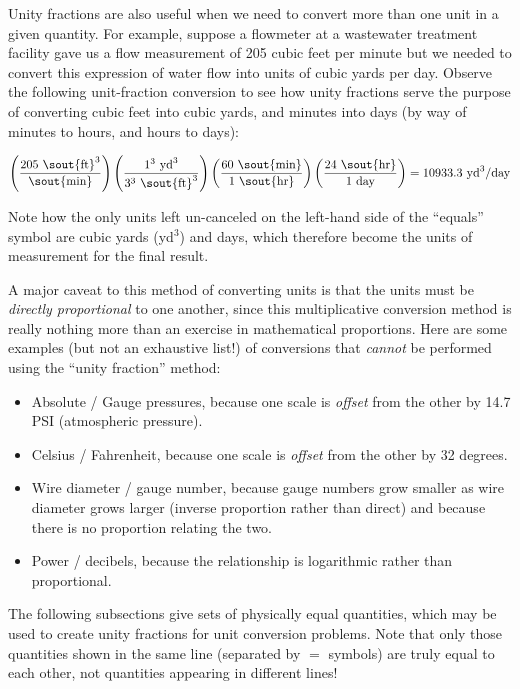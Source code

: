 \vskip 10pt

Unity fractions are also useful when we need to convert more than one unit in a given quantity.  For example, suppose a flowmeter at a wastewater treatment facility gave us a flow measurement of 205 cubic feet per minute but we needed to convert this expression of water flow into units of cubic yards per day.  Observe the following unit-fraction conversion to see how unity fractions serve the purpose of converting cubic feet into cubic yards, and minutes into days (by way of minutes to hours, and hours to days):

$$\left(205 \hbox{ \sout{ft}}^3 \over \hbox{\sout{min}} \right) \left(1^3 \hbox{ yd}^3 \over 3^3 \hbox{ \sout{ft}}^3\right) \left(60 \hbox{ \sout{min}} \over 1 \hbox{ \sout{hr}}\right) \left(24 \hbox{ \sout{hr}} \over 1 \hbox{ day}\right) = 10933.3 \hbox{ yd}^3\hbox{/day}$$

Note how the only units left un-canceled on the left-hand side of the ``equals'' symbol are cubic yards (yd$^{3}$) and days, which therefore become the units of measurement for the final result.

\vskip 10pt

A major caveat to this method of converting units is that the units must be \textit{directly proportional} to one another, since this multiplicative conversion method is really nothing more than an exercise in mathematical proportions.  Here are some examples (but not an exhaustive list!) of conversions that \textit{cannot} be performed using the ``unity fraction'' method:

\begin{itemize}
\item Absolute / Gauge pressures, because one scale is \textit{offset} from the other by 14.7 PSI (atmospheric pressure).
\item Celsius / Fahrenheit, because one scale is \textit{offset} from the other by 32 degrees.
\item Wire diameter / gauge number, because gauge numbers grow smaller as wire diameter grows larger (inverse proportion rather than direct) and because there is no proportion relating the two.
\item Power / decibels, because the relationship is logarithmic rather than proportional.
\end{itemize}

\vskip 10pt

The following subsections give sets of physically equal quantities, which may be used to create unity fractions for unit conversion problems.  Note that only those quantities shown in the same line (separated by $=$ symbols) are truly equal to each other, not quantities appearing in different lines!



